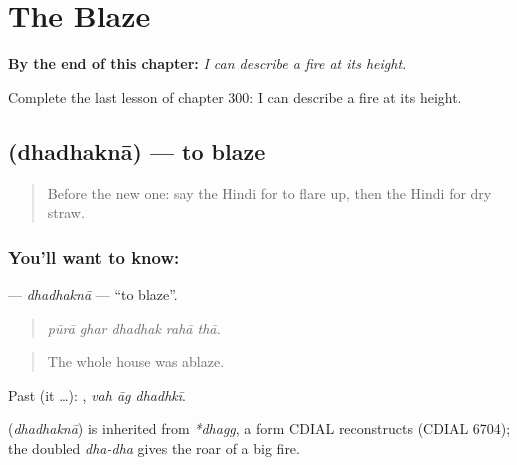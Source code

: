 
\chapter{The Blaze}
\label{ch:hi-the-blaze}

\begin{chapteropening}
\textbf{By the end of this chapter:} \emph{I can describe a fire at its height.}

Complete the last lesson of chapter 300: I can describe a fire at its height.
\end{chapteropening}

\section[\texorpdfstring{\hi{धधकना} (dhadhaknā)}{धधकना (dhadhaknā)}]{ (dhadhaknā) — to blaze}

\label{lesson:HI-C300-dhadhakna}



\begin{quote}
Before the new one: say the Hindi for to flare up, then the Hindi for dry straw.
\end{quote}

\subsection*{You'll want to know: }
\textbf{} — \emph{dhadhaknā} — \textquotedblleft{}to blaze\textquotedblright{}.

\begin{quote}
    
\end{quote}

\begin{quote}
\emph{pūrā ghar dhadhak rahā thā.}
\end{quote}

\begin{quote}
The whole house was ablaze.
\end{quote}

Past (it …):   , \emph{vah āg dhadhkī}.

\begin{cousinweb}
\textbf{} (\emph{dhadhaknā}) is inherited from \emph{*dhagg}, a form CDIAL reconstructs (CDIAL 6704); the doubled \emph{dha-dha} gives the roar of a big fire.
\end{cousinweb}

